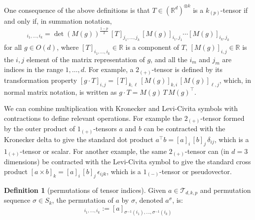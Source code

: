 \documentclass{article}
\theoremstyle{definition}
\newtheorem{definition}{Definition}
\newcommand{\tensorname}[2]{{#1}_{(#2)}}
\newcommand{\tensor}[2]{$\tensorname{#1}{#2}$-tensor}
\begin{document}
One consequence of the above definitions is that 
$T\in (\mathbb R^d)^{\otimes k}$ is a \tensor{k}{p} if and only if, in summation notation,
\begin{align}
    [g\cdot T]_{i_1,\ldots, i_k} = \det(M(g))^{\frac{1-p}{2}}\,[T]_{j_1,\ldots,j_k}\,[M(g)]_{i_1,j_1}\cdots[M(g)]_{i_k,j_k}
\end{align} for all $g\in O(d)$, where $[T]_{i_1, \ldots ,i_k} \in \mathbb R$ is a component of $T$, $[M(g)]_{i,j}\in\mathbb R$ is the $i,j$ element of the matrix representation of $g$, and all the $i_m$ and $j_m$ are indices in the range $1,\ldots,d$.
For example, a \tensor{2}{+} is defined by its transformation property
$[g\cdot T]_{i,j} = [T]_{k,\ell}\,[M(g)]_{k,i}\,[M(g)]_{\ell,j}$,
which, in normal matrix notation, is written as
$g\cdot T = M(g)\,T\,M(g)^\top$.

We can combine multiplication with Kronecker and Levi-Civita symbols with contractions to define relevant operations. For example the \tensor{2}{+} formed by the outer product of \tensor{1}{+}s $a$ and $b$ can be contracted with the Kronecker delta to give the standard dot product $a^\top b = [a]_i\,[b]_j\,\delta_{ij}$, which is a \tensor{1}{+} or scalar.
For another example, the same \tensor{2}{+} can (in $d=3$ dimensions) be contracted with the Levi-Civita symbol to give the standard cross product
$[a\times b]_k = [a]_i\,[b]_j\,\epsilon_{ijk}$, which is a \tensor{1}{-} or pseudovector.

\begin{definition}[permutations of tensor indices]
Given $a \in \mathcal{T}_{d,k,p}$ and permutation sequence $\sigma\in S_k$, the permutation of $a$ by $\sigma$, denoted $a^\sigma$, is:
\begin{equation}
    [a^\sigma]_{i_1, \ldots, i_k} := [a]_{\sigma^{-1}(i_1), \ldots, \sigma^{-1}(i_k)}
\end{equation}
\end{definition}

\end{document}
